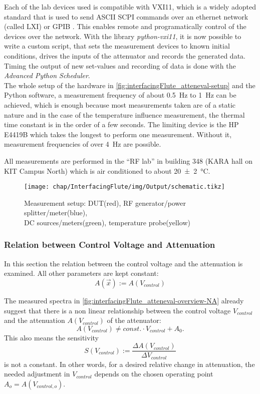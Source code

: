 Each of the lab devices used is compatible with VXI11, which is a widely adopted standard that is used to send ASCII SCPI commands over an ethernet network (called LXI) or GPIB \cite{lxi2021}.
This enables remote and programatically control of the devices over the network.
With the library \textit{python-vxi11}, it is now possible to write a custom script, that sets the measurement devices to known initial conditions, drives the inputs of the attenuator and records the generated data. Timing the output of new set-values and recording of data is done with the \textit{Advanced Python Scheduler}.\cite{apscheduler}\\ 
The whole setup of the hardware in \autoref{fig:interfacingFlute_atteneval-setup} and the Python software, a measurement frequency of about \SI{0.5}{\Hz} to \SI{1}{\Hz} can be achieved, which is enough because most measurements taken are of a static nature and in the case of the temperature influence measurement, the thermal time constant is in the order of a few seconds.
The limiting device is the HP E4419B which takes the longest to perform one measurement. Without it, measurement frequencies of over \SI{4}{\Hz} are possible.

All measurements are performed in the ``RF lab'' in building 348 (KARA hall on KIT Campus North) which is air conditioned to about \SI{20(2)}{\celsius}.

\begin{figure}[tb]
	\centering
	\texttt{[image: chap/InterfacingFlute/img/Output/schematic.tikz]}
	\caption{Measurement setup: DUT(red), RF generator/power splitter/meter(blue),\\ DC sources/meters(green), temperature probe(yellow)}
	\label{fig:interfacingFlute_atteneval-setup}
\end{figure}

\subsubsection{Relation between Control Voltage and Attenuation}
In this section the relation between the control voltage and the attenuation is examined. All other parameters are kept constant:
\begin{equation}
A(\vec{x}) := A(V_{control})
\end{equation}

The measured spectra in \autoref{fig:interfacingFlute_atteneval-overview-NA} already suggest that there is a non linear relationship between the control voltage $V_{control}$ and the attenuation $A(V_{control})$ of the attenuator:
\begin{equation}
A(V_{control}) \neq const. \cdot V_{control} + A_0.
\end{equation}
This also means the sensitivity
\begin{equation}
S(V_{control}) := \frac{\Delta A(V_{control})}{\Delta V_{control}}
\end{equation}
is not a constant.
In other words, for a desired relative change in attenuation, the needed adjustment in $V_{control}$ depends on the chosen operating point $A_o=A(V_{control,o})$.

